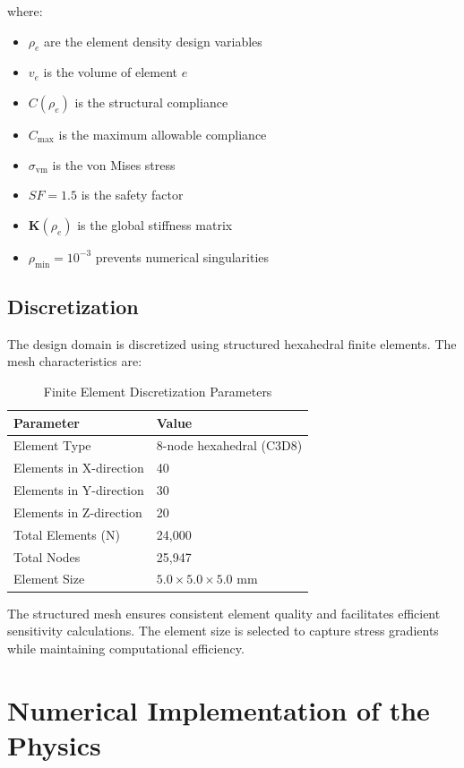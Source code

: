\documentclass[11pt]{report}
\newcommand{\matr}[1]{\mathbf{#1}}
\newcommand{\rhoe}{\rho_e}
\newcommand{\rhomin}{\rho_{\text{min}}}
\newcommand{\stiffmat}{\matr{K}}
\newcommand{\compliance}{C}
\newcommand{\sigmavm}{\sigma_{\text{vm}}}
\begin{document}
where:
\begin{itemize}
    \item $\rhoe$ are the element density design variables
    \item $v_e$ is the volume of element $e$
    \item $\compliance(\rhoe)$ is the structural compliance
    \item $\compliance_{\text{max}}$ is the maximum allowable compliance
    \item $\sigmavm$ is the von Mises stress
    \item $SF = 1.5$ is the safety factor
    \item $\stiffmat(\rhoe)$ is the global stiffness matrix
    \item $\rhomin = 10^{-3}$ prevents numerical singularities
\end{itemize}

\section{Discretization}
The design domain is discretized using structured hexahedral finite elements. The mesh characteristics are:

\begin{table}[h]
\centering
\caption{Finite Element Discretization Parameters}
\begin{tabular}{@{}ll@{}}
\toprule
Parameter & Value \\ 
\midrule
Element Type & 8-node hexahedral (C3D8) \\
Elements in X-direction & 40 \\
Elements in Y-direction & 30 \\
Elements in Z-direction & 20 \\
Total Elements (N) & 24,000 \\
Total Nodes & 25,947 \\
Element Size & $5.0 \times 5.0 \times 5.0$ mm \\
\bottomrule
\end{tabular}
\end{table}

The structured mesh ensures consistent element quality and facilitates efficient sensitivity calculations. The element size is selected to capture stress gradients while maintaining computational efficiency.

\chapter{Numerical Implementation of the Physics}
\end{document}
